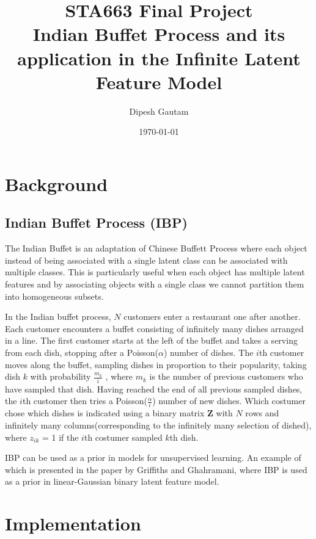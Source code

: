 \documentclass{article}
\begin{document}
\title{STA663 Final Project \\ Indian Buffet Process and its application in the Infinite Latent Feature Model}
\author{Dipesh Gautam}
\date{\today}
\maketitle

\section{Background}
\subsection{Indian Buffet Process (IBP)}
The Indian Buffet is an adaptation of Chinese Buffett Process where each object instead of being associated with a single latent class can  be associated with multiple classes. This is particularly useful when each object has multiple latent features and by associating objects with a single class we cannot partition them into homogeneous subsets.

In the Indian buffet process, $N$ customers enter a restaurant one after another. Each customer encounters a buffet
consisting of infinitely many dishes arranged in a line. The first customer starts at the left of the buffet and
takes a serving from each dish, stopping after a Poisson($\alpha$) number of dishes. The $i$th customer moves along the buffet,
sampling dishes in proportion to their popularity, taking dish $k$ with probability $\frac{m_k}{i}$ , where $m_k$ is the number of
previous customers who have sampled that dish. Having reached the end of all previous sampled dishes, the $i$th customer
then tries a Poisson($\frac{\alpha}{i}$) number of new dishes. Which costumer chose which dishes is indicated using a binary matrix \textbf{Z} with $N$ rows and infinitely many columns(corresponding to the infinitely many selection of dished), where $z_{ik}$ = 1 if the $i$th costumer sampled $k$th dish.

IBP can be used as a prior in models for unsupervised learning. An example of which is presented in the paper by Griffiths and Ghahramani, where IBP is used as a prior in linear-Gaussian binary latent feature model.


\section{Implementation}
\end{document}
